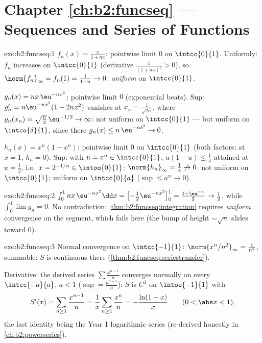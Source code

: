 \section*{Chapter \ref{ch:b2:funcseq} --- Sequences and Series of
Functions}

\begin{solution}{exo:b2:funcseq:1}
$f_n(x) = \frac{x}{1 + nx}$: pointwise limit $0$ on $\intcc{0}{1}$.
Uniformly: $f_n$ increases on $\intcc{0}{1}$ (derivative
$\frac{1}{(1+nx)^2} > 0$), so $\norm{f_n}_\infty = f_n(1) =
\frac{1}{1+n} \to 0$: \emph{uniform} on $\intcc{0}{1}$.

$g_n(x) = nx\,\eu^{-nx^2}$: pointwise limit $0$ (exponential
beats). Sup: $g_n' = n\eu^{-nx^2}(1 - 2nx^2)$ vanishes at $x_n =
\frac{1}{\sqrt{2n}}$, where $g_n(x_n) = \sqrt{\frac n2}\,\eu^{-1/2}
\to \infty$: not uniform on $\intcc{0}{1}$ --- but uniform on
$\intco{\delta}{1}$, since there $g_n(x) \leq n\,\eu^{-n\delta^2}
\to 0$.

$h_n(x) = x^n(1 - x^n)$: pointwise limit $0$ on $\intcc{0}{1}$
(both factors; at $x = 1$, $h_n = 0$). Sup: with $u = x^n \in
\intcc{0}{1}$, $u(1-u) \leq \frac14$ attained at $u = \frac12$,
i.e.\ $x = 2^{-1/n} \in \intoo{0}{1}$: $\norm{h_n}_\infty =
\frac14 \not\to 0$: not uniform on $\intcc{0}{1}$; uniform on
$\intcc{0}{a}$ ($\sup \leq a^n \to 0$).
\end{solution}

\begin{solution}{exo:b2:funcseq:2}
$\int_0^1 nx\,\eu^{-nx^2}\dd x = \bigl[-\tfrac12
\eu^{-nx^2}\bigr]_0^1 = \frac{1 - \eu^{-n}}{2} \to \frac12$, while
$\int_0^1 \lim g_n = 0$. No contradiction:
\cref{thm:b2:funcseq:integration} requires \emph{uniform}
convergence on the segment, which fails here (the bump of height
$\sim\sqrt n$ slides toward $0$).
\end{solution}

\begin{solution}{exo:b2:funcseq:3}
Normal convergence on $\intcc{-1}{1}$: $\norm{x^n/n^2}_\infty =
\frac{1}{n^2}$, summable: $S$ is continuous there
(\cref{thm:b2:funcseq:seriestransfer}).

Derivative: the derived series $\sum \frac{x^{n-1}}{n}$ converges
normally on every $\intcc{-a}{a}$, $a < 1$ ($\sup =
\frac{a^{n-1}}{n}$): $S$ is $C^1$ on $\intoo{-1}{1}$ with
\[
S'(x) = \sum_{n\geq1} \frac{x^{n-1}}{n} = \frac1x \sum_{n\geq1}
\frac{x^n}{n} = -\frac{\ln(1 - x)}{x}
\qquad (0 < \abs x < 1),
\]
the last identity being the Year 1 logarithmic series (re-derived
honestly in \cref{ch:b2:powerseries}).
\end{solution}

